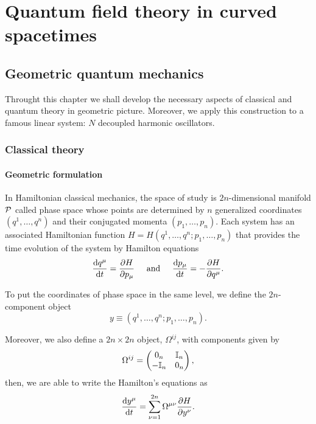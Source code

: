 \cleardoublepage
\setcounter{page}{1}

\part{Quantum field theory in curved spacetimes}

\chapter{Geometric quantum mechanics}
\pagestyle{fancy}
Throught this chapter we shall develop the necessary aspects of classical and quantum theory in geometric picture. Moreover, we apply this construction to a famous linear system: \(N\) decoupled harmonic oscillators.

\section{Classical theory}
\subsection*{Geometric formulation}
In Hamiltonian classical mechanics, the space of study is \(2n\)-dimensional manifold \({\mathcal{P}}\) called phase space whose points are determined by \(n\) generalized coordinates \((q^1,\dots,q^n)\) and their conjugated momenta \((p_1,\dots,p_n)\). Each system has an associated Hamiltonian function \(H=H(q^1,\dots,q^n;p_1,\dots,p_n)\) that provides the time evolution of the system by Hamilton equations
\begin{equation}
    \diff{q^{\mu}}{t}=\diffp{H}{p_{\mu}}\hspace{5mm}\text{and}\hspace{5mm}\diff{p_{\mu}}{t}=-\diffp{H}{q^\mu}.
    \label{eq:hamilton}
\end{equation}

To put the coordinates of phase space in the same level, we define the \(2n\)-component object 
\begin{equation}
    y\equiv\left(q^1,\dots,q^n;p_1,\dots,p_n\right).
\end{equation}

Moreover, we also define a \(2n\times 2n\) object, \(\Omega^{ij}\), with components given by
\begin{equation}
    \Omega^{ij}=
    \begin{pmatrix}
        0_n&{\mathbb{I}}_n\\
        -{\mathbb{I}}_n&0_n
    \end{pmatrix},
\end{equation}
then, we are able to write the Hamilton's equations as
\begin{equation}
    \diff{y^\mu}{t}=\sum_{\nu=1}^{2n}\Omega^{\mu\nu}\diffp{H}{y^{\nu}}.
\end{equation}

